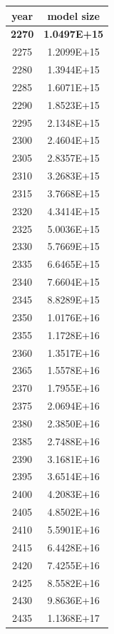 \documentclass[a4paper]{article}
\begin{document}
    \begin{tabular}{| c | c |}
    	\hline
    	year & model size \\\hline
    	\textbf{2270} & \textbf{1.0497E+15} \\\hline
    	2275 & 1.2099E+15 \\\hline
    	2280 & 1.3944E+15 \\\hline
    	2285 & 1.6071E+15 \\\hline
    	2290 & 1.8523E+15 \\\hline
    	2295 & 2.1348E+15 \\\hline
    	2300 & 2.4604E+15 \\\hline
    	2305 & 2.8357E+15 \\\hline
    	2310 & 3.2683E+15 \\\hline
    	2315 & 3.7668E+15 \\\hline
    	2320 & 4.3414E+15 \\\hline
    	2325 & 5.0036E+15 \\\hline
    	2330 & 5.7669E+15 \\\hline
    	2335 & 6.6465E+15 \\\hline
    	2340 & 7.6604E+15 \\\hline
    	2345 & 8.8289E+15 \\\hline
    	2350 & 1.0176E+16 \\\hline
    	2355 & 1.1728E+16 \\\hline
    	2360 & 1.3517E+16 \\\hline
    	2365 & 1.5578E+16 \\\hline
    	2370 & 1.7955E+16 \\\hline
    	2375 & 2.0694E+16 \\\hline
    	2380 & 2.3850E+16 \\\hline
    	2385 & 2.7488E+16 \\\hline
    	2390 & 3.1681E+16 \\\hline
    	2395 & 3.6514E+16 \\\hline
    	2400 & 4.2083E+16 \\\hline
    	2405 & 4.8502E+16 \\\hline
    	2410 & 5.5901E+16 \\\hline
    	2415 & 6.4428E+16 \\\hline
    	2420 & 7.4255E+16 \\\hline
    	2425 & 8.5582E+16 \\\hline
    	2430 & 9.8636E+16 \\\hline
    	2435 & 1.1368E+17 \\\hline

\end{tabular}
\end{document}
